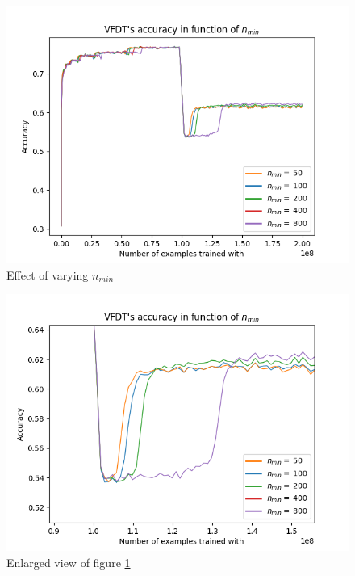 \documentclass[12pt]{article}
\begin{document}
\begin{figure}
	\centering
	\includegraphics[width=.8\linewidth]{./img/vfdt_nmin.png}
	\caption{Effect of varying $n_{min}$}
	\label{fig:vfdt_nmins}	
\end{figure}
\begin{figure}
	\centering
	\includegraphics[width=.8\linewidth]{../code/experiments/vfdt/plots/vfdt_nmin_zoom.png}
	\caption{Enlarged view of figure \ref{fig:vfdt_nmins}}
	\label{fig:vfdt_nmins_zoom}	
\end{figure}
\end{document}
